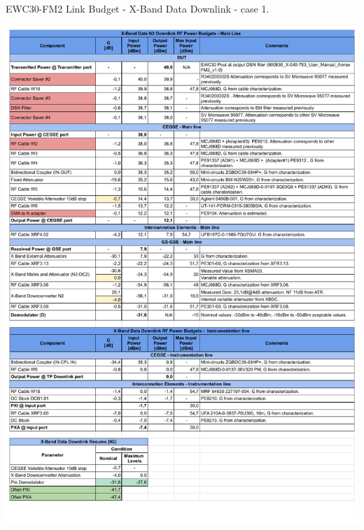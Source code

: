 \begin{table}[H]
	\centering
	\caption{EWC30-FM2 Link Budget - X-Band Data Downlink - case 1.} \label{tb:Data_DWL2}
	\includegraphics[page=1, scale=0.75, trim=0cm 0cm 0cm 0cm, clip ]
	{tables/Ensayos COMM-SS Link Budget - X-Band Data N2 Downlink.pdf}\\
\end{table}

